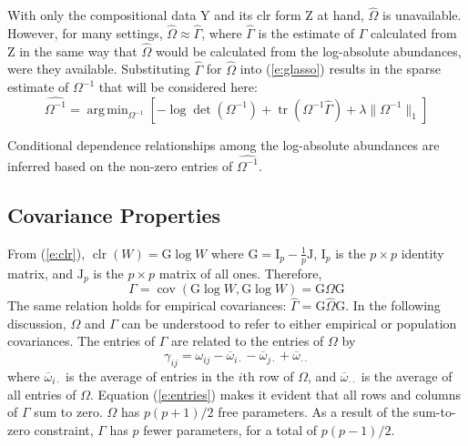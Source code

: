 \documentclass[10pt]{article}
\newcommand{\clr}{\operatorname{clr}}
\newcommand{\cov}{\operatorname{cov}}
\DeclareMathOperator*{\argmin}{arg\,min}
\DeclareMathOperator{\tr}{tr}
\begin{document}
With only the compositional data $\mathrm{Y}$ and its clr form $\mathrm{Z}$ at hand, $\hat{\Omega}$ is unavailable. However, for many settings, $\hat{\Omega} \approx \hat{\Gamma}$, where $\hat{\Gamma}$ is the estimate of $\Gamma$ calculated from $\mathrm{Z}$ in the same way that $\hat{\Omega}$ would be calculated from the log-absolute abundances, were they available. Substituting $\hat{\Gamma}$ for $\hat{\Omega}$ into (\ref{e:glasso}) results in the sparse estimate of $\Omega^{-1}$ that will be considered here:
\begin{equation}
\widehat{\Omega^{-1}} = \argmin_{\Omega^{-1}} \left[ -\log \det(\Omega^{-1}) + \tr(\Omega^{-1} \hat{\Gamma}) + \lambda \lVert \Omega^{-1} \rVert_1 \right]
\end{equation}

Conditional dependence relationships among the log-absolute abundances are inferred based on the non-zero entries of $\widehat{\Omega^{-1}}$.

\subsection*{Covariance Properties}

From (\ref{e:clr}), $\clr(W) = \mathrm{G} \log W$ where $\mathrm{G} = \mathrm{I}_p - \frac{1}{p}\mathrm{J}$, $\mathrm{I}_p$ is the $p \times p$ identity matrix, and $\mathrm{J}_p$ is the $p \times p$ matrix of all ones. Therefore,
\begin{equation}
\Gamma = \cov(\mathrm{G} \log W, \mathrm{G} \log W) = \mathrm{G} \Omega \mathrm{G}
\end{equation}
The same relation holds for empirical covariances: $\hat{\Gamma} = \mathrm{G} \hat{\Omega} \mathrm{G}$. In the following discussion, $\Omega$ and $\Gamma$ can be understood to refer to either empirical or population covariances. The entries of $\Gamma$ are related to the entries of $\Omega$ by
\begin{equation}
\label{e:entries}
\gamma_{ij} = \omega_{ij} - \overline{\omega}_{i\cdot} - \overline{\omega}_{j\cdot} + \overline{\omega}_{\cdot\cdot}
\end{equation}
where $\overline{\omega}_{i\cdot}$ is the average of entries in the $i$th row of $\Omega$, and $\overline{\omega}_{\cdot\cdot}$ is the average of all entries of $\Omega$. Equation (\ref{e:entries}) makes it evident that all rows and columns of $\Gamma$ sum to zero. $\Omega$ has $p(p+1)/2$ free parameters. As a result of the sum-to-zero constraint, $\Gamma$ has $p$ fewer parameters, for a total of $p(p-1)/2$.
\end{document}
